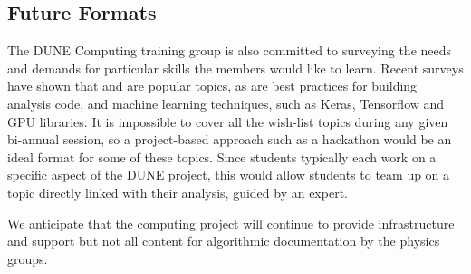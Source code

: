 \documentclass[../main-v1.tex]{subfiles}
\begin{document}
\subsection{Future Formats}
The DUNE Computing training group is also committed to surveying the needs and %
demands for particular %
skills the members would like to learn. Recent surveys have shown that  and  are popular topics, as are %
best practices for building analysis code, %
and machine learning techniques, such as Keras, Tensorflow and GPU libraries. %
It is impossible to cover all the wish-list topics during any given bi-annual session, %
so a project-based approach such as a hackathon would be an ideal format for some of these topics. Since  students typically each work on a specific aspect of the DUNE project, this would allow students to team up on %
a topic directly linked with their analysis, guided by an expert.

We anticipate that the computing project will continue to  provide infrastructure and support but not all content for algorithmic documentation by the physics groups.  %




\end{document}
